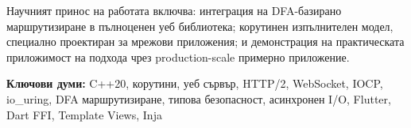 Научният принос на работата включва: интеграция на DFA-базирано маршрутизиране в пълноценен уеб библиотека; корутинен изпълнителен модел, специално проектиран за мрежови приложения; и демонстрация на практическата приложимост на подхода чрез production-scale примерно приложение.

\vspace{1cm}

\textbf{Ключови думи:} C++20, корутини, уеб сървър, HTTP/2, WebSocket, IOCP, io\_uring, DFA маршрутизиране, типова безопасност, асинхронен I/O, Flutter, Dart FFI, Template Views, Inja
